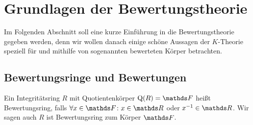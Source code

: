 \documentclass[ngerman,fontsize=11pt, paper=a4, parskip=half, titlepage=true, toc=bib]{scrartcl}
\begin{document}

\section{Grundlagen der Bewertungstheorie}

Im Folgenden Abschnitt soll eine kurze Einführung in die
Bewertungstheorie gegeben werden, denn wir wollen danach einige schöne
Aussagen der $K$-Theorie speziell für und mithilfe von sogenannten
bewerteten Körper betrachten.

\subsection{Bewertungsringe und Bewertungen}

\begin{Def}[Bewertungsring]\label{defbewertungsring}
  Ein Integritätsring $R$ mit Quotientenkörper $\Quot(R)=\F$ heißt
  Bewertungsring, falls $\forall x\in\F\colon x\in\R$ oder
  $x^{-1}\in\R$.
  Wir sagen auch $R$ ist Bewertungsring zum Körper $\F$.
\end{Def}
\end{document}
